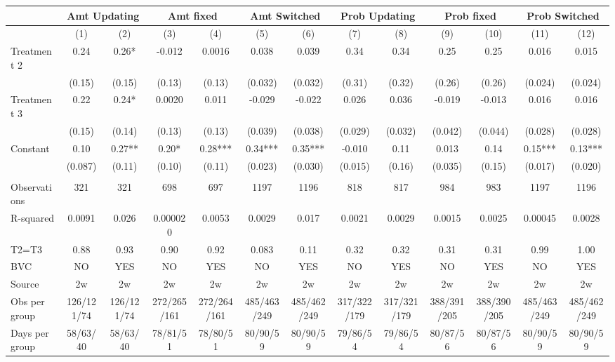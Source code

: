 \begin{tabular}{lcccccccccccc}
\toprule
      & \multicolumn{2}{c}{Amt Updating } & \multicolumn{2}{c}{Amt fixed} & \multicolumn{2}{c}{Amt Switched } & \multicolumn{2}{c}{Prob Updating } & \multicolumn{2}{c}{Prob fixed} & \multicolumn{2}{c}{Prob Switched } \\
\midrule
\midrule
      & (1)   & (2)   & (3)   & (4)   & (5)   & (6)   & (7)   & (8)   & (9)   & (10)  & (11)  & (12) \\
\midrule
\midrule
Treatment 2 & 0.24  & 0.26* & -0.012 & 0.0016 & 0.038 & 0.039 & 0.34  & 0.34  & 0.25  & 0.25  & 0.016 & 0.015 \\
      & (0.15) & (0.15) & (0.13) & (0.13) & (0.032) & (0.032) & (0.31) & (0.32) & (0.26) & (0.26) & (0.024) & (0.024) \\
Treatment 3 & 0.22  & 0.24* & 0.0020 & 0.011 & -0.029 & -0.022 & 0.026 & 0.036 & -0.019 & -0.013 & 0.016 & 0.016 \\
      & (0.15) & (0.14) & (0.13) & (0.13) & (0.039) & (0.038) & (0.029) & (0.032) & (0.042) & (0.044) & (0.028) & (0.028) \\
Constant & 0.10  & 0.27** & 0.20* & 0.28*** & 0.34*** & 0.35*** & -0.010 & 0.11  & 0.013 & 0.14  & 0.15*** & 0.13*** \\
      & (0.087) & (0.11) & (0.10) & (0.11) & (0.023) & (0.030) & (0.015) & (0.16) & (0.035) & (0.15) & (0.017) & (0.020) \\
      &       &       &       &       &       &       &       &       &       &       &       &  \\
\midrule
Observations & 321   & 321   & 698   & 697   & 1197  & 1196  & 818   & 817   & 984   & 983   & 1197  & 1196 \\
R-squared & 0.0091 & 0.026 & 0.000020 & 0.0053 & 0.0029 & 0.017 & 0.0021 & 0.0029 & 0.0015 & 0.0025 & 0.00045 & 0.0028 \\
T2=T3 & 0.88  & 0.93  & 0.90  & 0.92  & 0.083 & 0.11  & 0.32  & 0.32  & 0.31  & 0.31  & 0.99  & 1.00 \\
BVC   & NO    & YES   & NO    & YES   & NO    & YES   & NO    & YES   & NO    & YES   & NO    & YES \\
Source & 2w    & 2w    & 2w    & 2w    & 2w    & 2w    & 2w    & 2w    & 2w    & 2w    & 2w    & 2w \\
Obs per group & 126/121/74 & 126/121/74 & 272/265/161 & 272/264/161 & 485/463/249 & 485/462/249 & 317/322/179 & 317/321/179 & 388/391/205 & 388/390/205 & 485/463/249 & 485/462/249 \\
Days per group & 58/63/40 & 58/63/40 & 78/81/51 & 78/80/51 & 80/90/59 & 80/90/59 & 79/86/54 & 79/86/54 & 80/87/56 & 80/87/56 & 80/90/59 & 80/90/59 \\
\bottomrule
\bottomrule
\end{tabular}%
